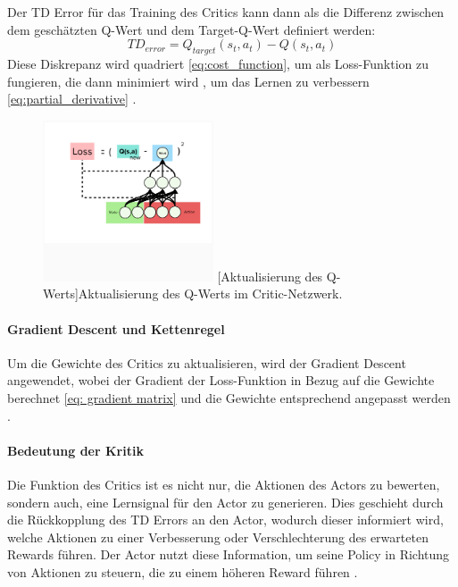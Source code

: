 Der TD Error für das Training des Critics kann dann als die Differenz zwischen dem geschätzten Q-Wert und dem Target-Q-Wert definiert werden:
\[ TD_{error} = Q_{target}(s_t, a_t) - Q(s_t, a_t) \]
Diese Diskrepanz wird quadriert \ref{eq:cost_function}, um als Loss-Funktion zu fungieren, die dann minimiert wird , um das Lernen zu verbessern \ref{eq:partial_derivative} \cite{SuttonBarto2018}.

\begin{figure}[htbp]
\centering
  \centering
  \includegraphics[width=0.45\textwidth, trim=10px 10px 10px 10px, clip]{2Grundlagen/35Q_value_Critick_update.png}
  [Aktualisierung des Q-Werts]{Aktualisierung des Q-Werts im Critic-Netzwerk.}
  \label{fig:update_q_value}
\end{figure}



\paragraph{Gradient Descent und Kettenregel}
Um die Gewichte des Critics zu aktualisieren, wird der Gradient Descent angewendet, wobei der Gradient der Loss-Funktion in Bezug auf die Gewichte berechnet \ref{eq: gradient matrix} und die Gewichte entsprechend angepasst werden \cite{aggarwal_neural_networks_2018}.




\paragraph{Bedeutung der Kritik}
Die Funktion des Critics ist es nicht nur, die Aktionen des Actors zu bewerten, sondern auch, eine Lernsignal für den Actor zu generieren. Dies geschieht durch die Rückkopplung des TD Errors an den Actor, wodurch dieser informiert wird, welche Aktionen zu einer Verbesserung oder Verschlechterung des erwarteten Rewards führen. Der Actor nutzt diese Information, um seine Policy in Richtung von Aktionen zu steuern, die zu einem höheren Reward führen \cite{Luck2019ImprovedExploration}.


